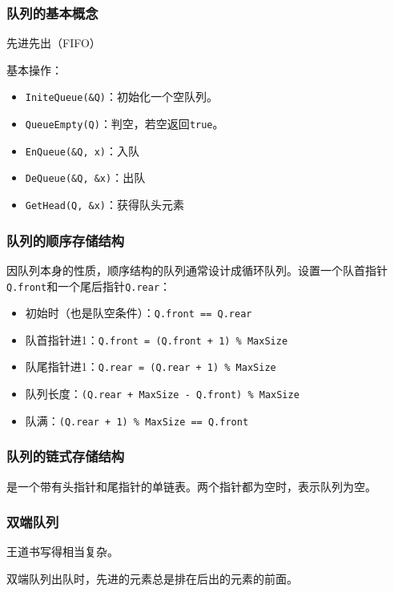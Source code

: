 \documentclass[12pt, a4paper, oneside]{ctexart}
\begin{document}
\subsubsection{队列的基本概念}

先进先出（FIFO）

基本操作：
\begin{itemize}
  \item \verb|IniteQueue(&Q)|：初始化一个空队列。
  \item \verb|QueueEmpty(Q)|：判空，若空返回\verb|true|。
  \item \verb|EnQueue(&Q, x)|：入队
  \item \verb|DeQueue(&Q, &x)|：出队
  \item \verb|GetHead(Q, &x)|：获得队头元素
\end{itemize}

\subsubsection{队列的顺序存储结构}

因队列本身的性质，顺序结构的队列通常设计成循环队列。设置一个队首指针\verb|Q.front|和一个尾后指针\verb|Q.rear|：
\begin{itemize}
  \item 初始时（也是队空条件）：\verb|Q.front == Q.rear|
  \item 队首指针进1：\verb|Q.front = (Q.front + 1) % MaxSize|
  \item 队尾指针进1：\verb|Q.rear = (Q.rear + 1) % MaxSize|
  \item 队列长度：\verb|(Q.rear + MaxSize - Q.front) % MaxSize|
  \item 队满：\verb|(Q.rear + 1) % MaxSize == Q.front|
\end{itemize}

\subsubsection{队列的链式存储结构}

是一个带有头指针和尾指针的单链表。两个指针都为空时，表示队列为空。

\subsubsection{双端队列}

王道书写得相当复杂。

双端队列出队时，先进的元素总是排在后出的元素的前面。
\end{document}
